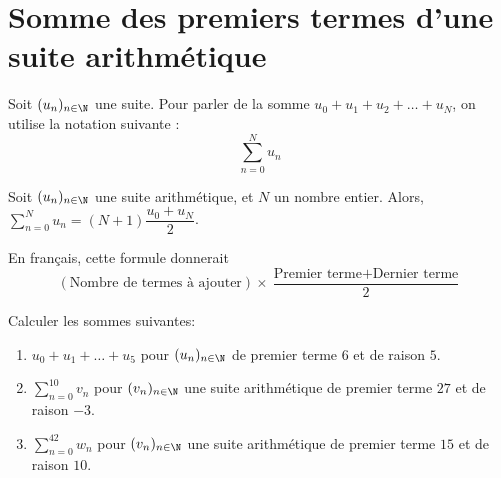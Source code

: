 \documentclass{poly}
\begin{document}
\section{Somme des premiers termes d'une suite arithmétique}
\begin{definition}
Soit $(u_n)_{n \in \N}$ une suite. Pour parler de la somme $u_0 + u_1 + u_2 + \dots + u_N$, on utilise la notation suivante :
\begin{equation*}
\sum_{n=0}^{N} u_n
\end{equation*}
\end{definition}
\begin{proposition}
Soit $(u_n)_{n \in \N}$ une suite arithmétique, et $N$ un nombre entier. Alors,
$\sum_{n=0}^{N} u_n = (N + 1) \dfrac{u_0 + u_N}{2}$.
\end{proposition}
\begin{remark}
En français, cette formule donnerait
\begin{equation*}
(\text{Nombre de termes à ajouter}) \times \dfrac{\text{Premier terme} + \text{Dernier terme}}{2}
\end{equation*}
\end{remark}
\begin{example}
Calculer les sommes suivantes:
\begin{enumerate}[label=\emph{\alph*)}]
\item $u_0 + u_1 + \dots + u_5$ pour $(u_n)_{n \in \N}$ de premier terme $6$ et de raison $5$.
\item $\sum_{n = 0}^{10} v_n$ pour $(v_n)_{n \in \N}$ une suite arithmétique de premier terme $27$ et de raison $-3$.
\item $\sum_{n = 0}^{42} w_n$ pour $(v_n)_{n \in \N}$ une suite arithmétique de premier terme $15$ et de raison $10$.
\end{enumerate}
\vspace*{8cm} 
\end{example}
\end{document}
